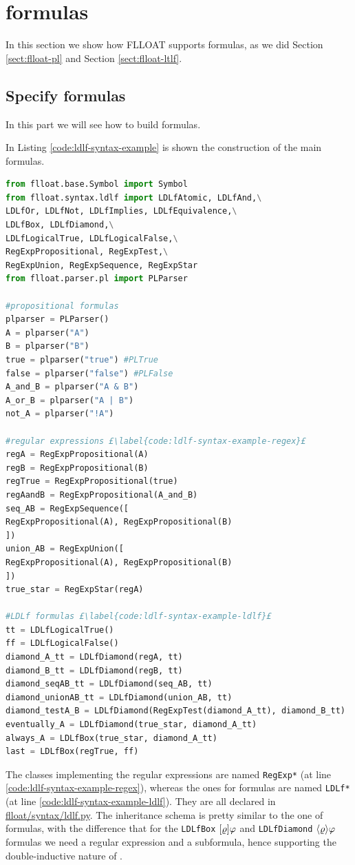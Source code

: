 \section{\LDLf formulas}\label{sect:flloat-ldlf}
In this section we show how FLLOAT supports \LDLf formulas, as we did Section \ref{sect:flloat-pl} and Section \ref{sect:flloat-ltlf}.
\subsection{Specify \LDLf formulas}
In this part we will see how to build \LDLf formulas.

In Listing \ref{code:ldlf-syntax-example} is shown the construction of the main \LDLf formulas.

\begin{lstlisting}[language=Python, style=Python, escapechar = £, label={code:ldlf-syntax-example}, caption={Examples of \LDLf formulas}]
from flloat.base.Symbol import Symbol
from flloat.syntax.ldlf import LDLfAtomic, LDLfAnd,\
LDLfOr, LDLfNot, LDLfImplies, LDLfEquivalence,\
LDLfBox, LDLfDiamond,\
LDLfLogicalTrue, LDLfLogicalFalse,\
RegExpPropositional, RegExpTest,\
RegExpUnion, RegExpSequence, RegExpStar 
from flloat.parser.pl import PLParser

#propositional formulas
plparser = PLParser() 
A = plparser("A")
B = plparser("B")
true = plparser("true") #PLTrue
false = plparser("false") #PLFalse
A_and_B = plparser("A & B")
A_or_B = plparser("A | B")
not_A = plparser("!A")

#regular expressions £\label{code:ldlf-syntax-example-regex}£
regA = RegExpPropositional(A)
regB = RegExpPropositional(B)
regTrue = RegExpPropositional(true)
regAandB = RegExpPropositional(A_and_B)
seq_AB = RegExpSequence([
RegExpPropositional(A), RegExpPropositional(B)
])
union_AB = RegExpUnion([
RegExpPropositional(A), RegExpPropositional(B)
])
true_star = RegExpStar(regA)

#LDLf formulas £\label{code:ldlf-syntax-example-ldlf}£
tt = LDLfLogicalTrue()
ff = LDLfLogicalFalse()
diamond_A_tt = LDLfDiamond(regA, tt)
diamond_B_tt = LDLfDiamond(regB, tt)
diamond_seqAB_tt = LDLfDiamond(seq_AB, tt)
diamond_unionAB_tt = LDLfDiamond(union_AB, tt)
diamond_testA_B = LDLfDiamond(RegExpTest(diamond_A_tt), diamond_B_tt)
eventually_A = LDLfDiamond(true_star, diamond_A_tt)
always_A = LDLfBox(true_star, diamond_A_tt)
last = LDLfBox(regTrue, ff)
\end{lstlisting}
The classes implementing the regular expressions are named \texttt{RegExp*} (at line \ref{code:ldlf-syntax-example-regex}), whereas the ones for \LDLf formulas are named \texttt{LDLf*} (at line \ref{code:ldlf-syntax-example-ldlf}). They are all declared in \href{https://github.com/MarcoFavorito/flloat/blob/0.1.4/flloat/syntax/ldlf.py}{flloat/syntax/ldlf.py}. The inheritance schema is pretty similar to the one of \LTLf formulas, with the difference that for the \texttt{LDLfBox} $[\varrho]\varphi$ and \texttt{LDLfDiamond} $\langle \varrho \rangle\varphi$ formulas we need a regular expression and a \LDLf subformula, hence supporting the double-inductive nature of \LDLf.

